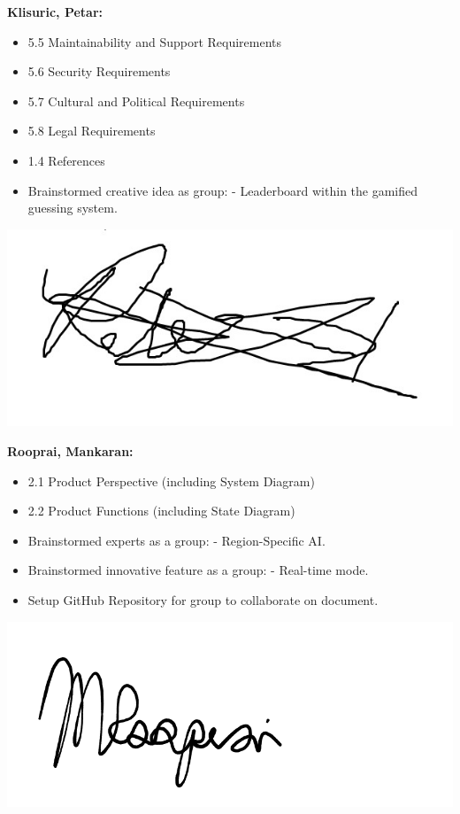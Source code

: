 \documentclass[]{article}
\begin{document}
\textbf{Klisuric, Petar:}
\begin{itemize}
	\item 5.5 Maintainability and Support Requirements
	\item 5.6 Security Requirements
	\item 5.7 Cultural and Political Requirements
	\item 5.8 Legal Requirements
	\item 1.4 References
    \item Brainstormed creative idea as group:
		\subitem - Leaderboard within the gamified guessing system.
\end{itemize}
\includegraphics[scale=0.15]{petarsignature.jpg}

\textbf{Rooprai, Mankaran:}
\begin{itemize}
	\item 2.1 Product Perspective (including System Diagram)
	\item 2.2 Product Functions (including State Diagram)
	\item Brainstormed experts as a group:
		\subitem - Region-Specific AI.
	\item Brainstormed innovative feature as a group:
		\subitem - Real-time mode.
  	\item Setup GitHub Repository for group to collaborate on document.
\end{itemize}
\includegraphics[scale=0.15]{mankaransignature.png}
\end{document}
